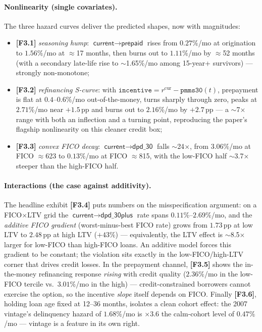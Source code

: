 \documentclass[11pt,a4paper]{article}
\newcommand{\code}[1]{\texttt{#1}}
\newcommand{\state}[1]{\textsf{#1}}
\newcommand{\artifact}[1]{\textbf{[#1]}}
\begin{document}
\paragraph{Nonlinearity (single covariates).} The three hazard curves deliver the predicted shapes, now with magnitudes:
\begin{itemize}[itemsep=1pt]
\item \artifact{F3.1} \emph{seasoning hump}: $\state{current}\to\state{prepaid}$ rises from $0.27\%$/mo at origination to $1.56\%$/mo at $\approx$17 months, then burns out to $1.11\%$/mo by $\approx$52 months (with a secondary late-life rise to $\sim$1.65\%/mo among 15-year+ survivors) --- strongly non-monotone;
\item \artifact{F3.2} \emph{refinancing S-curve}: with $\code{incentive}=r^{\mathrm{cur}}-\code{pmms30}(t)$, prepayment is flat at $0.4$--$0.6\%$/mo out-of-the-money, turns sharply through zero, peaks at $2.71\%$/mo near $+1.5$\,pp and burns out to $2.16\%$/mo by $+2.7$\,pp --- a $\sim$7$\times$ range with both an inflection and a turning point, reproducing the paper's flagship nonlinearity on this cleaner credit box;
\item \artifact{F3.3} \emph{convex FICO decay}: $\state{current}\to\state{dpd\_30}$ falls $\sim$24$\times$, from $3.06\%$/mo at FICO $\approx$623 to $0.13\%$/mo at FICO $\approx$815, with the low-FICO half $\sim$3.7$\times$ steeper than the high-FICO half.
\end{itemize}

\paragraph{Interactions (the case against additivity).} The headline exhibit \artifact{F3.4} puts numbers on the misspecification argument: on a FICO$\times$LTV grid the $\state{current}\to\state{dpd\_30plus}$ rate spans $0.11\%$--$2.69\%$/mo, and the \emph{additive FICO gradient} (worst-minus-best FICO rate) grows from $1.73$\,pp at low LTV to $2.48$\,pp at high LTV ($+43\%$) --- equivalently, the LTV effect is $\sim$8.5$\times$ larger for low-FICO than high-FICO loans. An additive model forces this gradient to be constant; the violation sits exactly in the low-FICO/high-LTV corner that drives credit losses. In the prepayment channel, \artifact{F3.5} shows the in-the-money refinancing response \emph{rising} with credit quality ($2.36\%$/mo in the low-FICO tercile vs.\ $3.01\%$/mo in the high) --- credit-constrained borrowers cannot exercise the option, so the incentive \emph{slope} itself depends on FICO. Finally \artifact{F3.6}, holding loan age fixed at 12--36 months, isolates a clean cohort effect: the 2007 vintage's delinquency hazard of $1.68\%$/mo is $\times$3.6 the calm-cohort level of $0.47\%$/mo --- vintage is a feature in its own right.
\end{document}
